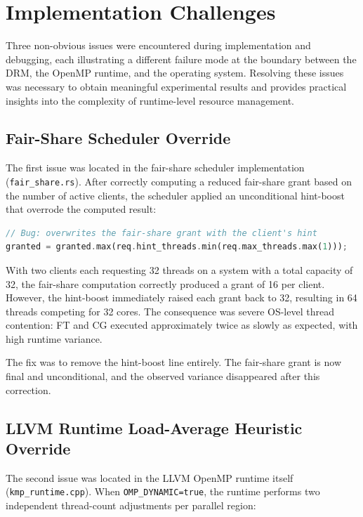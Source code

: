 \section{Implementation Challenges}\label{sec:bugs}

Three non-obvious issues were encountered during implementation and debugging, each illustrating a different failure mode at the boundary between the DRM, the OpenMP runtime, and the operating system. Resolving these issues was necessary to obtain meaningful experimental results and provides practical insights into the complexity of runtime-level resource management.

\subsection{Fair-Share Scheduler Override}

The first issue was located in the fair-share scheduler implementation (\texttt{fair\_share.rs}). After correctly computing a reduced fair-share grant based on the number of active clients, the scheduler applied an unconditional hint-boost that overrode the computed result:

\begin{lstlisting}[language=Rust]
// Bug: overwrites the fair-share grant with the client's hint
granted = granted.max(req.hint_threads.min(req.max_threads.max(1)));
\end{lstlisting}

With two clients each requesting 32 threads on a system with a total capacity of 32, the fair-share computation correctly produced a grant of 16 per client. However, the hint-boost immediately raised each grant back to 32, resulting in 64 threads competing for 32 cores. The consequence was severe OS-level thread contention: FT and CG executed approximately twice as slowly as expected, with high runtime variance.

The fix was to remove the hint-boost line entirely. The fair-share grant is now final and unconditional, and the observed variance disappeared after this correction.

\subsection{LLVM Runtime Load-Average Heuristic Override}

The second issue was located in the LLVM OpenMP runtime itself (\texttt{kmp\_runtime.cpp}). When \texttt{OMP\_DYNAMIC=true}, the runtime performs two independent thread-count adjustments per parallel region:

